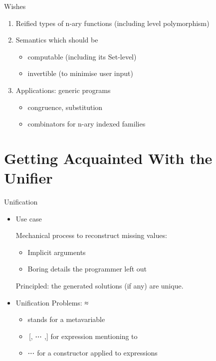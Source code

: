 \documentclass[compress,9pt]{beamer}
\begin{document}
\begin{frame}{Wishes}

  \begin{enumerate}
    \item Reified types of n-ary functions (including level polymorphism)
    \bigskip
    \item Semantics which should be
      \begin{itemize}
        \item computable (including its Set-level)
        \item invertible (to minimise user input)
      \end{itemize}
    \bigskip
    \item Applications: generic programs
      \begin{itemize}
        \item congruence, substitution
        \item combinators for n-ary indexed families
      \end{itemize}
    \end{enumerate}

\end{frame}

\section{Getting Acquainted With the Unifier}

\begin{frame}{Unification}

  \begin{itemize}
    \item Use case\medskip

    Mechanical process to reconstruct missing values:
    \begin{itemize}
      \item Implicit arguments
      \item Boring details the programmer left out
    \end{itemize}

    Principled: the generated solutions (if any) are unique.

    \bigskip

    \item Unification Problems: { ≈ }\medskip

    \begin{itemize}
      \item {} stands for a metavariable
      \item {\,[, ⋯ ,]} for expression  mentioning  to 
      \item {  ⋯  for a} constructor  applied to  expressions
    \end{itemize}

  \end{itemize}
\end{frame}
\end{document}
